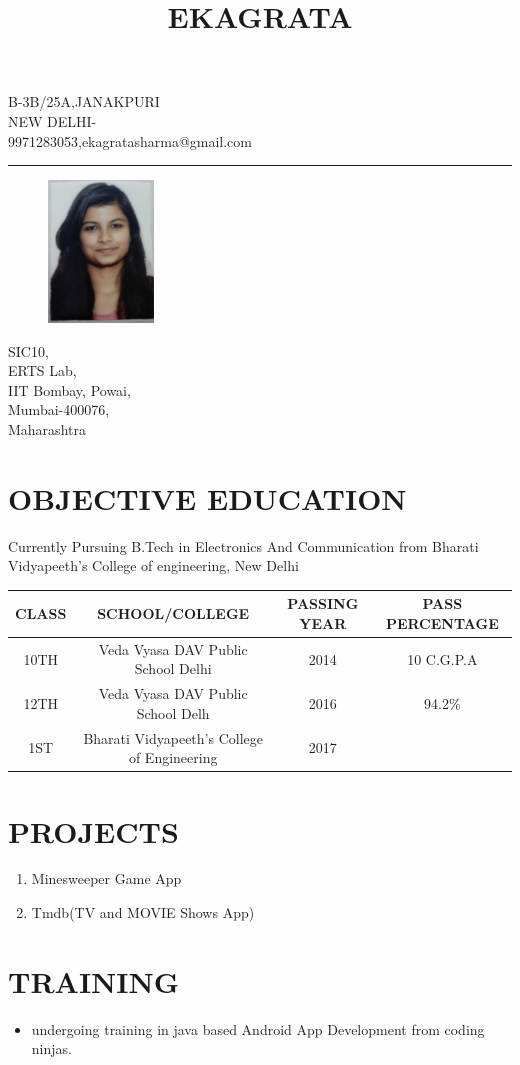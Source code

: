 \documentclass{article}
\date{}
\begin{document}
\title{EKAGRATA}
\maketitle
\vspace{-2cm}


\begin{center}

{\large B-3B/25A,JANAKPURI\\
NEW DELHI-\\
9971283053,ekagratasharma@gmail.com\\} 
\end{center}
\noindent\rule{15cm}{1pt}

\begin{figure}
    \centering
    \includegraphics[width=0.25\textwidth]{photo.jpg}
\end{figure}

SIC10,\\
ERTS Lab,\\
IIT Bombay, Powai,\\
Mumbai-400076,\\
Maharashtra

\vspace{1cm}

\section{OBJECTIVE EDUCATION}
\large Currently Pursuing B.Tech in Electronics And Communication from Bharati Vidyapeeth's College of engineering, New Delhi
\begin{center}
\begin{tabular}{ |c|c|c|c|} 
 \hline
 CLASS &SCHOOL/COLLEGE  & PASSING YEAR & PASS PERCENTAGE \\ 
\hline
 10TH & Veda Vyasa DAV Public School Delhi & 2014 & 10 C.G.P.A \\ 
 12TH & Veda Vyasa DAV Public School Delh& 2016 & 94.2\% \\ 
 1ST   & Bharati Vidyapeeth's College of Engineering& 2017& \\
 \hline
\end{tabular}
\end{center}
\section{PROJECTS}
\Large
\begin{enumerate}
\item Minesweeper Game App
\item Tmdb(TV and MOVIE Shows App) 
\end{enumerate}

\section{TRAINING}
\begin{itemize}
\item undergoing training in java based Android App Development from coding ninjas.
\end{itemize}
\end{document}
